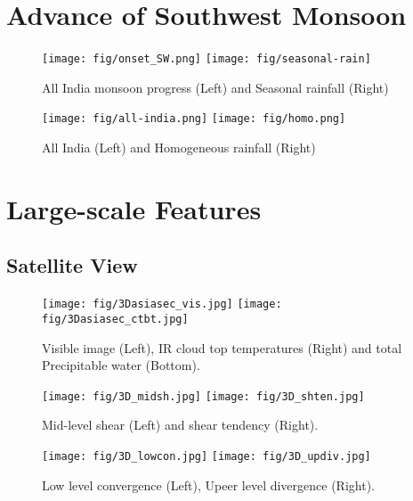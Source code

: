 \documentclass[10pt,a4paper]{article} %
\begin{document}
\section{Advance of Southwest Monsoon}
\begin{figure}[H]
\centering
\texttt{[image: fig/onset\_SW.png]}
\texttt{[image: fig/seasonal-rain]}
\caption{All India monsoon progress (Left) and Seasonal rainfall (Right)}
\end{figure}



\begin{figure}[H]
\centering
\texttt{[image: fig/all-india.png]}
\texttt{[image: fig/homo.png]}
\caption{All India  (Left) and Homogeneous rainfall (Right)}
\end{figure}


\section{Large-scale Features}


\subsection{Satellite View}

\begin{figure}[H]
\centering
\texttt{[image: fig/3Dasiasec\_vis.jpg]}
\texttt{[image: fig/3Dasiasec\_ctbt.jpg]}\\
\caption{Visible image (Left), IR cloud top temperatures (Right) and total Precipitable water (Bottom).}
\end{figure}

\begin{figure}[H]
\centering
\texttt{[image: fig/3D\_midsh.jpg]}
\texttt{[image: fig/3D\_shten.jpg]}
\caption{Mid-level shear (Left) and shear tendency (Right).}
\end{figure}


\begin{figure}[H]
\centering
\texttt{[image: fig/3D\_lowcon.jpg]}
\texttt{[image: fig/3D\_updiv.jpg]}

\caption{Low level convergence (Left), Upeer level divergence  (Right).}
\end{figure}
\end{document}
